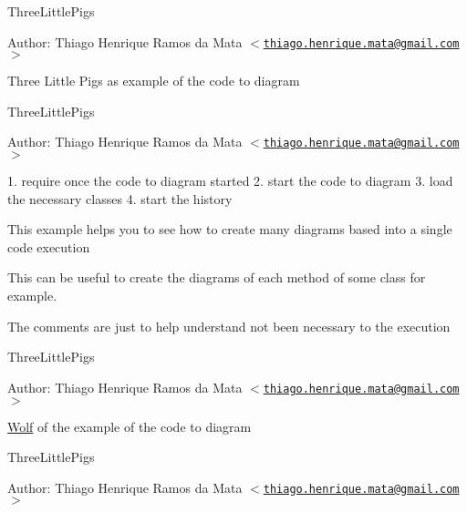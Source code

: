 ThreeLittlePigs \begin{Desc}
\item[Author:]Thiago Henrique Ramos da Mata $<$\href{mailto:thiago.henrique.mata@gmail.com}{\tt thiago.henrique.mata@gmail.com}$>$\end{Desc}
Three Little Pigs as example of the code to diagram

ThreeLittlePigs \begin{Desc}
\item[Author:]Thiago Henrique Ramos da Mata $<$\href{mailto:thiago.henrique.mata@gmail.com}{\tt thiago.henrique.mata@gmail.com}$>$\end{Desc}
1. require once the code to diagram started 2. start the code to diagram 3. load the necessary classes 4. start the history

This example helps you to see how to create many diagrams based into a single code execution

This can be useful to create the diagrams of each method of some class for example.

The comments are just to help understand not been necessary to the execution

ThreeLittlePigs \begin{Desc}
\item[Author:]Thiago Henrique Ramos da Mata $<$\href{mailto:thiago.henrique.mata@gmail.com}{\tt thiago.henrique.mata@gmail.com}$>$\end{Desc}
\hyperlink{class_wolf}{Wolf} of the example of the code to diagram

ThreeLittlePigs \begin{Desc}
\item[Author:]Thiago Henrique Ramos da Mata $<$\href{mailto:thiago.henrique.mata@gmail.com}{\tt thiago.henrique.mata@gmail.com}$>$ \end{Desc}


